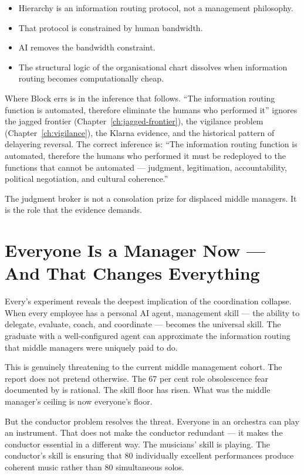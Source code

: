 \begin{itemize}
  \item Hierarchy is an information routing protocol, not a management philosophy.
  \item That protocol is constrained by human bandwidth.
  \item AI removes the bandwidth constraint.
  \item The structural logic of the organisational chart dissolves when information routing becomes computationally cheap.
\end{itemize}

Where Block errs is in the inference that follows. ``The information routing function is automated, therefore eliminate the humans who performed it'' ignores the jagged frontier (Chapter~\ref{ch:jagged-frontier}), the vigilance problem (Chapter~\ref{ch:vigilance}), the Klarna evidence, and the historical pattern of delayering reversal. The correct inference is: ``The information routing function is automated, therefore the humans who performed it must be redeployed to the functions that cannot be automated --- judgment, legitimation, accountability, political negotiation, and cultural coherence.''

The judgment broker is not a consolation prize for displaced middle managers. It is the role that the evidence demands.

\section{Everyone Is a Manager Now --- And That Changes Everything}

Every's experiment \parencite{Shipper2026} reveals the deepest implication of the coordination collapse. When every employee has a personal AI agent, management skill --- the ability to delegate, evaluate, coach, and coordinate --- becomes the universal skill. The graduate with a well-configured agent can approximate the information routing that middle managers were uniquely paid to do.

This is genuinely threatening to the current middle management cohort. The report does not pretend otherwise. The 67 per cent role obsolescence fear documented by \textcite{Capgemini2025} is rational. The skill floor has risen. What was the middle manager's ceiling is now everyone's floor.

But the conductor problem resolves the threat. Everyone in an orchestra can play an instrument. That does not make the conductor redundant --- it makes the conductor essential in a different way. The musicians' skill is playing. The conductor's skill is ensuring that 80 individually excellent performances produce coherent music rather than 80 simultaneous solos.

